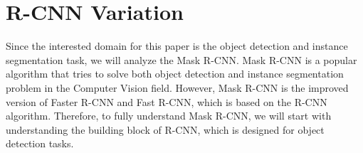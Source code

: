 \chapter{R-CNN Variation} \label{chap:rcnn_variation}

Since the interested domain for this paper is the object detection and instance segmentation task, we will analyze the Mask R-CNN. Mask R-CNN is a popular algorithm that tries to solve both object detection and instance segmentation problem in the Computer Vision field. However, Mask R-CNN is the improved version of Faster R-CNN and Fast R-CNN, which is based on the R-CNN algorithm. Therefore, to fully understand Mask R-CNN, we will start with understanding the building block of R-CNN, which is designed for object detection tasks.







